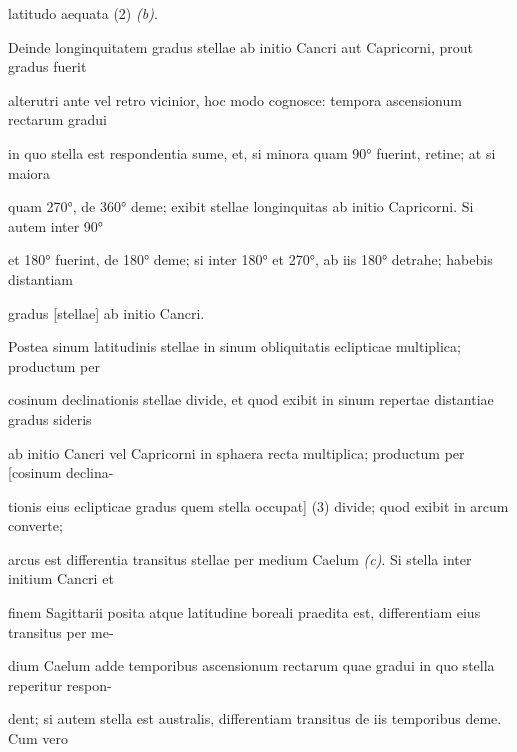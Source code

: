 \documentclass[11pt]{article}
\begin{document}
\noindent\hypertarget{AB01-PDF0121-body-L006}{}latitudo aequata (2) \textit{(b)}.\strut\par
\noindent\hypertarget{AB01-PDF0121-body-L007}{}Deinde longinquitatem gradus stellae ab initio Cancri aut Capricorni, prout gradus fuerit\strut\par
\noindent\hypertarget{AB01-PDF0121-body-L008}{}alterutri ante vel retro vicinior, hoc modo cognosce: tempora ascensionum rectarum gradui\strut\par
\noindent\hypertarget{AB01-PDF0121-body-L009}{}in quo stella est respondentia sume, et, si minora quam 90° fuerint, retine; at si maiora\strut\par
\noindent\hypertarget{AB01-PDF0121-body-L010}{}quam 270°, de 360° deme; exibit stellae longinquitas ab initio Capricorni. Si autem inter 90°\strut\par
\noindent\hypertarget{AB01-PDF0121-body-L011}{}et 180° fuerint, de 180° deme; si inter 180° et 270°, ab iis 180° detrahe; habebis distantiam\strut\par
\noindent\hypertarget{AB01-PDF0121-body-L012}{}gradus [stellae] ab initio Cancri.\strut\par
\noindent\hypertarget{AB01-PDF0121-body-L013}{}Postea sinum latitudinis stellae in sinum obliquitatis eclipticae multiplica; productum per\strut\par
\noindent\hypertarget{AB01-PDF0121-body-L014}{}cosinum declinationis stellae divide, et quod exibit in sinum repertae distantiae gradus sideris\strut\par
\noindent\hypertarget{AB01-PDF0121-body-L015}{}ab initio Cancri vel Capricorni in sphaera recta multiplica; productum per [cosinum declina-\strut\par
\noindent\hypertarget{AB01-PDF0121-body-L016}{}tionis eius eclipticae gradus quem stella occupat] (3) divide; quod exibit in arcum converte;\strut\par
\noindent\hypertarget{AB01-PDF0121-body-L017}{}arcus est differentia transitus stellae per medium Caelum \textit{(c)}. Si stella inter initium Cancri et\strut\par
\noindent\hypertarget{AB01-PDF0121-body-L018}{}finem Sagittarii posita atque latitudine boreali praedita est, differentiam eius transitus per me-\strut\par
\noindent\hypertarget{AB01-PDF0121-body-L019}{}dium Caelum adde temporibus ascensionum rectarum quae gradui in quo stella reperitur respon-\strut\par
\noindent\hypertarget{AB01-PDF0121-body-L020}{}dent; si autem stella est australis, differentiam transitus de iis temporibus deme. Cum vero\strut\par
\end{document}
